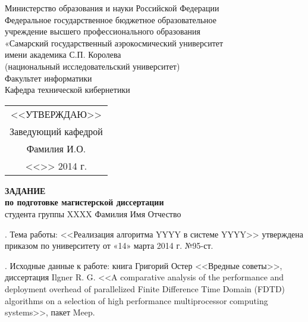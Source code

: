 \begin{center}
{\normalsize
Министерство образования и науки Российской Федерации\\
Федеральное государственное бюджетное образовательное\\
учреждение высшего профессионального образования\\
 «Самарский государственный аэрокосмический университет\\
 имени академика С.П. Королева\\
 (национальный исследовательский университет)\\[10pt]
Факультет информатики \\
Кафедра технической кибернетики
}
\end{center}

\begin{flushright}
\begin{tabular}{c}
<<УТВЕРЖДАЮ>>\\
Заведующий кафедрой\\
\underline{\phantom{заведующий}} Фамилия И.О.\\
<<\underline{\phantom{301}}>>\underline{\phantom{февраль}} 2014 г.
\end{tabular}
\end{flushright}

\begin{center}
{\bfseries
ЗАДАНИЕ\\
по подготовке магистерской диссертации\\
}
студента группы XXXX Фамилия Имя Отчество
\end{center}
. Тема работы: <<Реализация алгоритма YYYY в системе YYYY>> утверждена приказом по университету от «14» марта 2014 г. №95-ст.

. Исходные данные к работе: книга Григорий Остер <<Вредные советы>>, диссертация Ilgner R. G. <<A comparative analysis of the performance and deployment overhead of parallelized Finite Difference Time Domain (FDTD) algorithms on a selection of high performance multiprocessor computing systems>>, пакет Meep.

